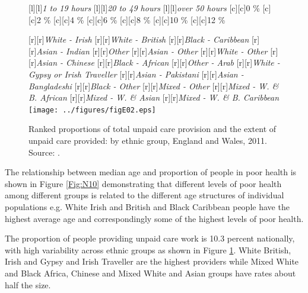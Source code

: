 \documentclass[11 pt, a4paper]{report}
\begin{document}
\begin{figure}[hbtp!]
[l][l]{\small{\emph{1 to 19 hours}}}
[l][l]{\small{\emph{20 to 49 hours}}}
[l][l]{\small{\emph{over 50 hours}}}
[c][c]{\small{0 \%}}
[c][c]{\small{2 \%}}
[c][c]{\small{4 \%}}
[c][c]{\small{6 \%}}
[c][c]{\small{8 \%}}
[c][c]{\small{10 \%}}
[c][c]{\small{12 \%}}

[r][r]{\scriptsize{\emph{White - Irish}}}
[r][r]{\scriptsize{\emph{White - British}}}
[r][r]{\scriptsize{\emph{Black - Caribbean}}}
[r][r]{\scriptsize{\emph{Asian - Indian}}}
[r][r]{\scriptsize{\emph{Other}}}
[r][r]{\scriptsize{\emph{Asian - Other}}}
[r][r]{\scriptsize{\emph{White - Other}}}
[r][r]{\scriptsize{\emph{Asian - Chinese}}}
[r][r]{\scriptsize{\emph{Black - African}}}
[r][r]{\scriptsize{\emph{Other - Arab}}}
[r][r]{\scriptsize{\emph{White - Gypsy or Irish Traveller}}}
[r][r]{\scriptsize{\emph{Asian - Pakistani}}}
[r][r]{\scriptsize{\emph{Asian - Bangladeshi}}}
[r][r]{\scriptsize{\emph{Black - Other}}}
[r][r]{\scriptsize{\emph{Mixed - Other}}}
[r][r]{\scriptsize{\emph{Mixed - W. \& B. African}}}
[r][r]{\scriptsize{\emph{Mixed - W. \& Asian}}}
[r][r]{\scriptsize{\emph{Mixed - W. \& B. Caribbean}}}
\texttt{[image: ../figures/figE02.eps]}
\caption{Ranked proportions of total unpaid care provision and the extent of unpaid care
provided: by ethnic group, England and Wales, 2011. Source: \cite{ONS2013}.
}\label{Fig:N12} %
\end{figure}


The relationship between median age and proportion of people in poor health is shown in Figure \ref{Fig:N10} demonstrating that different levels of poor health among different groups is related to the different age structures of individual populations e.g. White Irish and British and Black Caribbean  people have the highest average age and correspondingly some of the highest levels of poor health. 

The proportion of people providing unpaid care work is 10.3 percent nationally, with high variability across ethnic groups as shown in Figure \ref{Fig:N12}. White British, Irish and Gypsy and Irish Traveller are the highest providers while Mixed White and Black Africa, Chinese and Mixed White and Asian groups have rates about half the size. 
\end{document}
